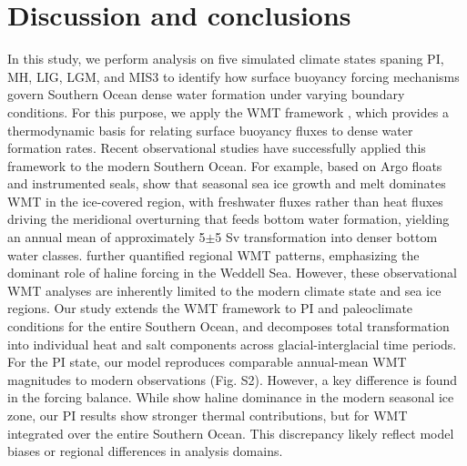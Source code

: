 \documentclass[draft]{agujournal2025}
\begin{document}

\section{Discussion and conclusions}

In this study, we perform analysis on five simulated climate states spaning PI, MH, LIG, LGM, and MIS3 to identify how surface buoyancy forcing mechanisms govern Southern Ocean dense water formation under varying boundary conditions. For this purpose, we apply the WMT framework \cite{Walin1982,Groeskamp2019,drake2025water}, which  provides a thermodynamic basis for relating surface buoyancy fluxes to dense water formation rates. Recent observational studies have successfully applied this framework to the modern Southern Ocean. For example, based on Argo floats and instrumented seals,  show that seasonal sea ice growth and melt dominates WMT in the ice-covered region, with freshwater fluxes rather than heat fluxes driving the meridional overturning that feeds bottom water formation, yielding an annual mean of approximately 5$\pm$5 Sv transformation into denser bottom water classes.  further quantified regional WMT patterns, emphasizing the dominant role of haline forcing in the Weddell Sea. However, these observational WMT analyses are inherently limited to the modern climate state and sea ice regions. Our study extends the WMT framework to PI and paleoclimate conditions for the entire Southern Ocean, and decomposes total transformation into individual heat and salt components across glacial-interglacial time periods. For the PI state, our model reproduces comparable annual-mean WMT magnitudes to modern observations (Fig. S2). However, a key difference is found in the forcing balance. While  show haline dominance in the modern seasonal ice zone, our PI results show stronger thermal contributions, but for WMT integrated over the entire Southern Ocean. This discrepancy likely reflect model biases or regional differences in analysis domains.
\end{document}
